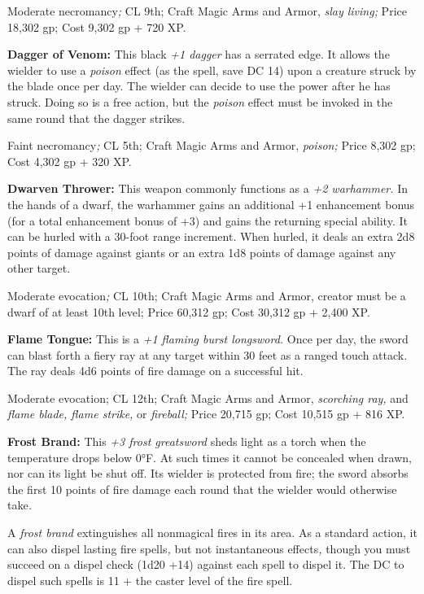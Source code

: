 \documentclass{article}
\begin{document}
Moderate necromancy\textit{; }CL 9th; Craft Magic Arms and Armor, \textit{slay 
living; }Price 18,302 gp; Cost 9,302 gp + 720 XP.

\textbf{Dagger of Venom: }This black \textit{+1 dagger }has a serrated edge. It 
allows the wielder to use a \textit{poison }effect (as the spell, save DC 14) upon 
a creature struck by the blade once per day. The wielder can decide to use the 
power after he has struck. Doing so is a free action, but the \textit{poison }effect 
must be invoked in the same round that the dagger strikes.

Faint necromancy\textit{; }CL 5th; Craft Magic Arms and Armor, \textit{poison; 
}Price 8,302 gp; Cost 4,302 gp + 320 XP.

\textbf{Dwarven Thrower: }This weapon commonly functions as a \textit{+2 warhammer. 
}In the hands of a dwarf, the warhammer gains an additional +1 enhancement bonus 
(for a total enhancement bonus of +3) and gains the returning special ability. 
It can be hurled with a 30-foot range increment. When hurled, it deals an extra 
2d8 points of damage against giants or an extra 1d8 points of damage against any 
other target.

Moderate evocation\textit{; }CL 10th; Craft Magic Arms and Armor, creator must 
be a dwarf of at least 10th level; Price 60,312 gp; Cost 30,312 gp + 2,400 XP.

\textbf{Flame Tongue:} This is a \textit{+1 flaming burst longsword. }Once per 
day, the sword can blast forth a fiery ray at any target within 30 feet as a ranged 
touch attack. The ray deals 4d6 points of fire damage on a successful hit.

Moderate evocation; CL 12th; Craft Magic Arms and Armor, \textit{scorching ray, 
}and \textit{flame blade, flame strike, }or \textit{fireball; }Price 20,715 gp; 
Cost 10,515 gp + 816 XP.

\textbf{Frost Brand:} This \textit{+3 frost greatsword }sheds light as a torch 
when the temperature drops below 0°F. At such times it cannot be concealed when 
drawn, nor can its light be shut off. Its wielder is protected from fire; the sword 
absorbs the first 10 points of fire damage each round that the wielder would otherwise 
take\textit{.}

A \textit{frost brand }extinguishes all nonmagical fires in its area. As a standard 
action, it can also dispel lasting fire spells\textit{, }but not instantaneous 
effects\textit{, }though you must succeed on a dispel check (1d20 +14) against 
each spell to dispel it. The DC to dispel such spells is 11 + the caster level 
of the fire spell.
\end{document}
